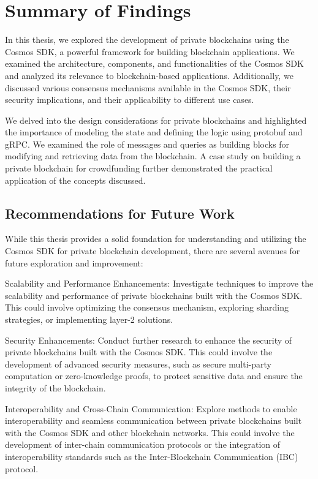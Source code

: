 \chapter{Summary of Findings}
\label{ch:conclusion}

In this thesis, we explored the development of private blockchains using the Cosmos SDK, a powerful framework for building blockchain applications. We examined the architecture, components, and functionalities of the Cosmos SDK and analyzed its relevance to blockchain-based applications. Additionally, we discussed various consensus mechanisms available in the Cosmos SDK, their security implications, and their applicability to different use cases.

We delved into the design considerations for private blockchains and highlighted the importance of modeling the state and defining the logic using protobuf and gRPC. We examined the role of messages and queries as building blocks for modifying and retrieving data from the blockchain. A case study on building a private blockchain for crowdfunding further demonstrated the practical application of the concepts discussed.

\section{Recommendations for Future Work}

While this thesis provides a solid foundation for understanding and utilizing the Cosmos SDK for private blockchain development, there are several avenues for future exploration and improvement:

    Scalability and Performance Enhancements: Investigate techniques to improve the scalability and performance of private blockchains built with the Cosmos SDK. This could involve optimizing the consensus mechanism, exploring sharding strategies, or implementing layer-2 solutions.

    Security Enhancements: Conduct further research to enhance the security of private blockchains built with the Cosmos SDK. This could involve the development of advanced security measures, such as secure multi-party computation or zero-knowledge proofs, to protect sensitive data and ensure the integrity of the blockchain.

    Interoperability and Cross-Chain Communication: Explore methods to enable interoperability and seamless communication between private blockchains built with the Cosmos SDK and other blockchain networks. This could involve the development of inter-chain communication protocols or the integration of interoperability standards such as the Inter-Blockchain Communication (IBC) protocol.

